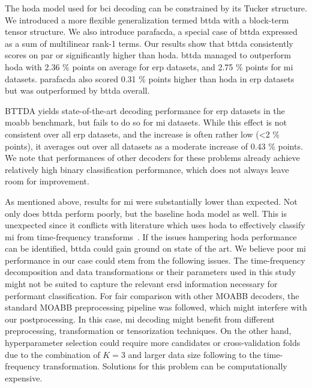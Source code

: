 \documentclass[twocolumn]{article}
\begin{document}
The \ac{hoda} model used for \ac{bci} decoding can be constrained by its
Tucker structure.
We introduced a more flexible generalization termed \ac{bttda} with a
block-term tensor structure.
We also introduce \ac{parafacda}, a special case of \ac{bttda} expressed as a
sum of multilinear rank-1 terms.
Our results show that \ac{bttda} consistently scores on par or significantly higher than
\ac{hoda}.
\Ac{bttda} managed to outperform \ac{hoda} with 2.36 \% points on average for
\ac{erp} datasets, and 2.75 \% points for \ac{mi} datasets.
\Ac{parafacda} also scored 0.31 \% points higher than  \ac{hoda} in \ac{erp} datasets
but was outperformed by \ac{bttda} overall.

BTTDA yields state-of-the-art decoding performance for \ac{erp}
datasets in the \ac{moabb} benchmark, but fails to do so for \ac{mi} datasets.
While this effect is not consistent over all \ac{erp} datasets, and the
increase is often rather low (<2 \% points), it averages out over all datasets
as a moderate increase of 0.43 \% points.
We note that performances of other decoders for these problems already achieve
relatively high binary classification performance, which does not always leave
room for improvement.

As mentioned above, results for \ac{mi} were substantially lower than expected.
Not only does \ac{bttda} perform poorly, but the baseline \ac{hoda} model as well.
This is unexpected since it conflicts with literature which uses \ac{hoda} to
effectively classify \ac{mi} from time-frequency transforms~\cite{Phan2010,Lotte2018,Liu2015,Cai2021}.
If the issues hampering \ac{hoda} performance can be identified, \ac{bttda}
could gain ground on state of the art.
We believe poor \ac{mi} performance in our case could stem from the following issues.
The time-frequency decomposition and data transformations or their parameters
used in this study might not be suited to capture the relevant \ac{ersd}
information necessary for performant classification.
For fair comparison with other MOABB decoders, the standard MOABB preprocessing
pipeline was followed, which might interfere with our postprocessing.
In this case, \ac{mi} decoding might benefit from different preprocessing,
transformation or	tensorization techniques.
On the other hand, hyperparameter selection could require more candidates or
cross-validation folds due to the combination of $K=3$ and larger data size following to the
time-frequency transformation.
Solutions for this problem can be computationally expensive.
\end{document}
